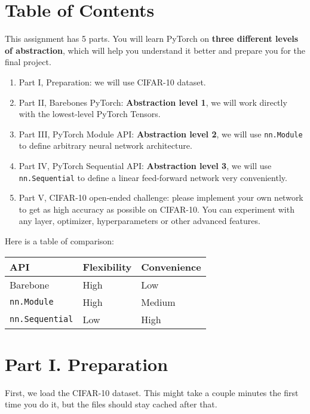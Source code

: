 \documentclass[11pt]{article}
\providecommand{\tightlist}{%
      \setlength{\itemsep}{0pt}\setlength{\parskip}{0pt}}
\begin{document}
    \hypertarget{table-of-contents}{%
\section{Table of Contents}\label{table-of-contents}}

This assignment has 5 parts. You will learn PyTorch on \textbf{three
different levels of abstraction}, which will help you understand it
better and prepare you for the final project.

\begin{enumerate}
\def\labelenumi{\arabic{enumi}.}
\tightlist
\item
  Part I, Preparation: we will use CIFAR-10 dataset.
\item
  Part II, Barebones PyTorch: \textbf{Abstraction level 1}, we will work
  directly with the lowest-level PyTorch Tensors.
\item
  Part III, PyTorch Module API: \textbf{Abstraction level 2}, we will
  use \texttt{nn.Module} to define arbitrary neural network
  architecture.
\item
  Part IV, PyTorch Sequential API: \textbf{Abstraction level 3}, we will
  use \texttt{nn.Sequential} to define a linear feed-forward network
  very conveniently.
\item
  Part V, CIFAR-10 open-ended challenge: please implement your own
  network to get as high accuracy as possible on CIFAR-10. You can
  experiment with any layer, optimizer, hyperparameters or other
  advanced features.
\end{enumerate}

Here is a table of comparison:

\begin{longtable}[]{@{}lll@{}}
\toprule\noalign{}
API & Flexibility & Convenience \\
\midrule\noalign{}
\endhead
\bottomrule\noalign{}
\endlastfoot
Barebone & High & Low \\
\texttt{nn.Module} & High & Medium \\
\texttt{nn.Sequential} & Low & High \\
\end{longtable}

    \hypertarget{part-i.-preparation}{%
\section{Part I. Preparation}\label{part-i.-preparation}}

First, we load the CIFAR-10 dataset. This might take a couple minutes
the first time you do it, but the files should stay cached after that.
\end{document}

